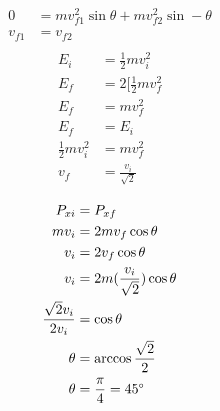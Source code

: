 \documentclass[11pt,letterpaper, twocolumn]{article}
\begin{document}
\begin{align*}
    0&=mv_{f1}^2\sin\theta + mv_{f2}^2\sin-\theta\\
    v_{f1}&=v_{f2}\\
\end{align*}
\begin{align*}
    E_i &= \frac{1}{2}mv_i^2\\
    E_{f} &= 2[\frac{1}{2}mv_f^2\\
    E_{f} &= mv_f^2\\
    E_f &= E_i\\
    \frac{1}{2}mv_i^2 &= mv_f^2\\
    v_f &= \frac{v_i}{\sqrt{2}}\\
\end{align*}
\begin{align*}
    P_{xi} &= P_{xf}\\
    mv_i &= 2mv_f\cos\theta\\
    v_i&=2v_f\cos\theta\\
    v_i &= 2m(\frac{v_i}{\sqrt{2}})\cos\theta\\
    \frac{\sqrt{2}v_i}{2v_i} &= \cos\theta\\
    \theta &= \arccos{\frac{\sqrt{2}}{2}}\\
    \theta &= \frac{\pi}{4} = 45\text{\textdegree }
\end{align*}
\end{document}
